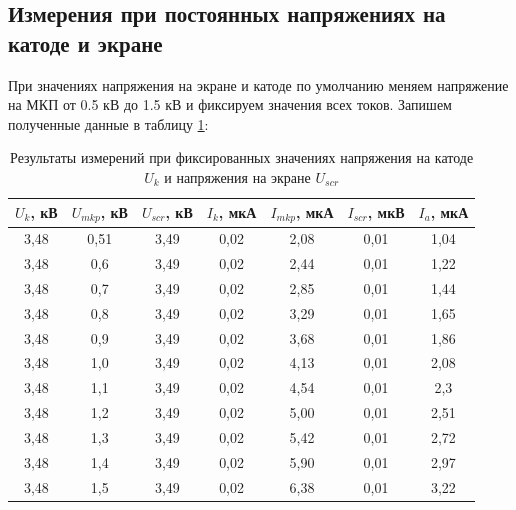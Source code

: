 

\subsection* {Измерения при постоянных напряжениях на катоде и экране}

При значениях напряжения на экране и катоде по умолчанию меняем напряжение на МКП от 0.5 кВ до 1.5 кВ и фиксируем значения всех токов. Запишем полученные данные в таблицу \ref{1}:

\begin{table}[h]
\centering
\begin{tabular}{|c|c|c|c|c|c|c|}
\hline
$U_{k}$, кВ & $U_{mkp}$, кВ & $U_{scr}$, кВ & $I_{k}$, мкА & $I_{mkp}$, мкА & $I_{scr}$, мкВ & $I_{a}$, мкА \\ \hline
3,48     & 0,51  & 3,49  & 0,02  & 2,08  & 0,01  & 1,04 \\ \hline
3,48     & 0,6   & 3,49  & 0,02  & 2,44  & 0,01  & 1,22 \\ \hline
3,48     & 0,7   & 3,49  & 0,02  & 2,85  & 0,01  & 1,44 \\ \hline
3,48     & 0,8   & 3,49  & 0,02  & 3,29  & 0,01  & 1,65 \\ \hline
3,48     & 0,9   & 3,49  & 0,02  & 3,68  & 0,01  & 1,86 \\ \hline
3,48     & 1,0     & 3,49  & 0,02  & 4,13  & 0,01  & 2,08 \\ \hline
3,48     & 1,1   & 3,49  & 0,02  & 4,54  & 0,01  & 2,3  \\ \hline
3,48     & 1,2   & 3,49  & 0,02  & 5,00     & 0,01  & 2,51 \\ \hline
3,48     & 1,3   & 3,49  & 0,02  & 5,42  & 0,01  & 2,72 \\ \hline
3,48     & 1,4   & 3,49  & 0,02  & 5,90   & 0,01  & 2,97 \\ \hline
3,48     & 1,5   & 3,49  & 0,02  & 6,38  & 0,01  & 3,22 \\ \hline
\end{tabular}
\caption{Результаты измерений при фиксированных значениях напряжения на катоде $U_{k}$ и напряжения на экране $U_{scr}$}
\label{1}
\end{table}

